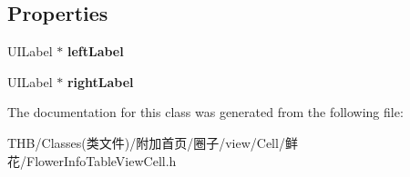 \subsection*{Properties}
\begin{DoxyCompactItemize}
\item 
\mbox{\label{interface_flower_info_table_view_cell_ac0b9e2c6b06d96f2a58629be5ece6eb2}} 
U\+I\+Label $\ast$ {\bfseries left\+Label}
\item 
\mbox{\label{interface_flower_info_table_view_cell_a317fc644a84cc5e7b484f0f33b3905ce}} 
U\+I\+Label $\ast$ {\bfseries right\+Label}
\end{DoxyCompactItemize}


The documentation for this class was generated from the following file\+:\begin{DoxyCompactItemize}
\item 
T\+H\+B/\+Classes(类文件)/附加首页/圈子/view/\+Cell/鲜花/Flower\+Info\+Table\+View\+Cell.\+h\end{DoxyCompactItemize}
